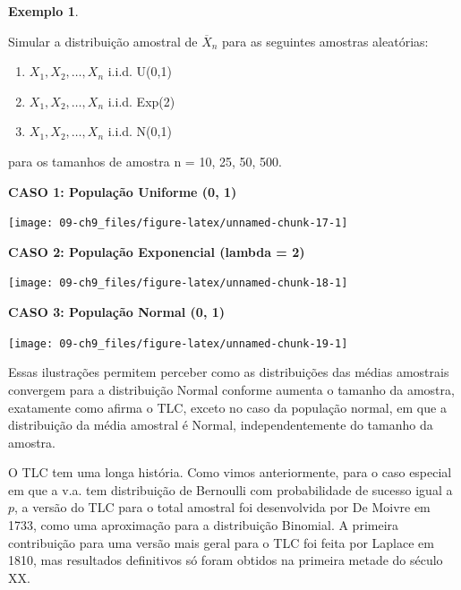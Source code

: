 \documentclass[
]{book}
\providecommand{\tightlist}{%
  \setlength{\itemsep}{0pt}\setlength{\parskip}{0pt}}
\theoremstyle{definition}
\theoremstyle{definition}
\newtheorem{example}{Exemplo}[chapter]
\theoremstyle{definition}
\theoremstyle{remark}
\begin{document}
\begin{example}
\protect\hypertarget{exm:unnamed-chunk-16}{}{\label{exm:unnamed-chunk-16} }
\end{example}

Simular a distribuição amostral de \(\overline{X}_n\) para as seguintes amostras aleatórias:

\begin{enumerate}
\def\labelenumi{\arabic{enumi}.}
\tightlist
\item
  \(X_1, X_2, \ldots, X_n\) i.i.d. U(0,1)\\
\item
  \(X_1, X_2, \ldots, X_n\) i.i.d. Exp(2)\\
\item
  \(X_1, X_2, \ldots, X_n\) i.i.d. N(0,1)
\end{enumerate}

para os tamanhos de amostra n = 10, 25, 50, 500.

\textbf{CASO 1: População Uniforme (0, 1)}

\begin{center}\texttt{[image: 09-ch9\_files/figure-latex/unnamed-chunk-17-1]} \end{center}

\textbf{CASO 2: População Exponencial (lambda = 2)}

\begin{center}\texttt{[image: 09-ch9\_files/figure-latex/unnamed-chunk-18-1]} \end{center}

\textbf{CASO 3: População Normal (0, 1)}

\begin{center}\texttt{[image: 09-ch9\_files/figure-latex/unnamed-chunk-19-1]} \end{center}

Essas ilustrações permitem perceber como as distribuições das médias amostrais convergem para a distribuição Normal conforme aumenta o tamanho da amostra, exatamente como afirma o TLC, exceto no caso da população normal, em que a distribuição da média amostral é Normal, independentemente do tamanho da amostra.

O TLC tem uma longa história. Como vimos anteriormente, para o caso especial em que a v.a. tem distribuição de Bernoulli com probabilidade de sucesso igual a \(p\), a versão do TLC para o total amostral foi desenvolvida por De Moivre em 1733, como uma aproximação para a distribuição Binomial. A primeira contribuição para uma versão mais geral para o TLC foi feita por Laplace em 1810, mas resultados definitivos só foram obtidos na primeira metade do século XX.
\end{document}
